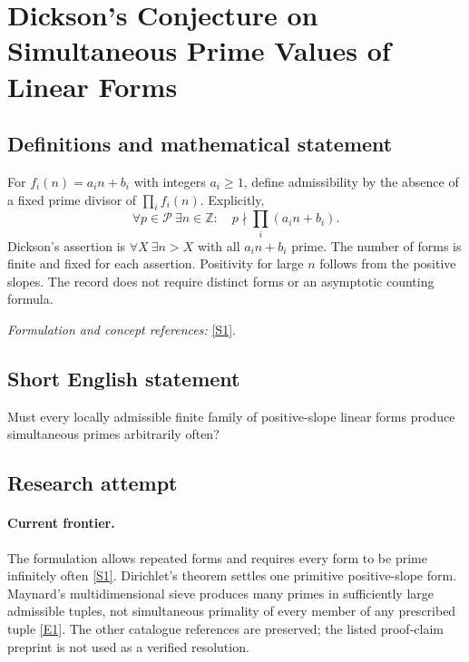 \documentclass[11pt,a4paper]{article}
\newcommand{\Z}{\mathbb{Z}}
\newcommand{\sref}[2]{\hyperlink{source:#1:#2}{[S#2]}}
\newcommand{\eref}[2]{\hyperlink{extra:#1:#2}{[E#2]}}
\newif\ifshowcatalogue
\newcommand{\cataloguescope}[1]{\ifshowcatalogue
 \paragraph{Exact scope in the supplied catalogue.}
 \begin{quote}\small #1\end{quote}\fi}
\numberwithin{equation}{section}
\begin{document}
\setcounter{section}{61}
\clearpage
\section{\texorpdfstring{Dickson's Conjecture on Simultaneous Prime Values of Linear Forms}{Dickson's Conjecture on Simultaneous Prime Values of Linear Forms}}\label{62}
\subsection{Definitions and mathematical statement}
For $f_i(n)=a_in+b_i$ with integers $a_i\ge1$, define admissibility by the absence of a fixed prime divisor of $\prod_i f_i(n)$. Explicitly,
\[
 \forall p\in\mathcal P\ \exists n\in\Z:\quad p\nmid\prod_i(a_in+b_i).
\]
Dickson's assertion is $\forall X\ \exists n>X$ with all $a_in+b_i$ prime. The number of forms is finite and fixed for each assertion. Positivity for large $n$ follows from the positive slopes. The record does not require distinct forms or an asymptotic counting formula.
\par\smallskip\textit{Formulation and concept references:} \sref{62}{1}.
\cataloguescope{For every integer k>=1 and every family f\_i(n)=a\_i*n+b\_i (1<=i<=k) with integers a\_i>=1 and b\_i, if for each prime p some integer n has p not dividing the product of the f\_i(n), then infinitely many positive integers n make every f\_i(n) prime.}
\subsection{Short English statement}
Must every locally admissible finite family of positive-slope linear forms produce simultaneous primes arbitrarily often?
\subsection{Research attempt}

\paragraph{Current frontier.}
The formulation allows repeated forms and requires every form to be prime infinitely often \sref{62}{1}. Dirichlet's theorem settles one primitive positive-slope form. Maynard's multidimensional sieve produces many primes in sufficiently large admissible tuples, not simultaneous primality of every member of any prescribed tuple \eref{62}{1}. The other catalogue references are preserved; the listed proof-claim preprint is not used as a verified resolution.
\end{document}
